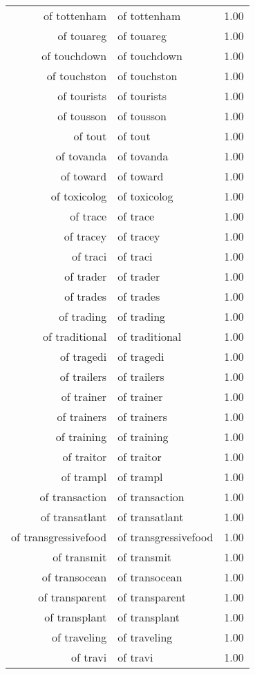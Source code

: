 \begin{table}[ht]
\begin{tabular}{rlr}
  of tottenham & of tottenham & 1.00 \\ 
  of touareg & of touareg & 1.00 \\ 
  of touchdown & of touchdown & 1.00 \\ 
  of touchston & of touchston & 1.00 \\ 
  of tourists & of tourists & 1.00 \\ 
  of tousson & of tousson & 1.00 \\ 
  of tout & of tout & 1.00 \\ 
  of tovanda & of tovanda & 1.00 \\ 
  of toward & of toward & 1.00 \\ 
  of toxicolog & of toxicolog & 1.00 \\ 
  of trace & of trace & 1.00 \\ 
  of tracey & of tracey & 1.00 \\ 
  of traci & of traci & 1.00 \\ 
  of trader & of trader & 1.00 \\ 
  of trades & of trades & 1.00 \\ 
  of trading & of trading & 1.00 \\ 
  of traditional & of traditional & 1.00 \\ 
  of tragedi & of tragedi & 1.00 \\ 
  of trailers & of trailers & 1.00 \\ 
  of trainer & of trainer & 1.00 \\ 
  of trainers & of trainers & 1.00 \\ 
  of training & of training & 1.00 \\ 
  of traitor & of traitor & 1.00 \\ 
  of trampl & of trampl & 1.00 \\ 
  of transaction & of transaction & 1.00 \\ 
  of transatlant & of transatlant & 1.00 \\ 
  of transgressivefood & of transgressivefood & 1.00 \\ 
  of transmit & of transmit & 1.00 \\ 
  of transocean & of transocean & 1.00 \\ 
  of transparent & of transparent & 1.00 \\ 
  of transplant & of transplant & 1.00 \\ 
  of traveling & of traveling & 1.00 \\ 
  of travi & of travi & 1.00 \\ 

\end{tabular}
\end{table}
